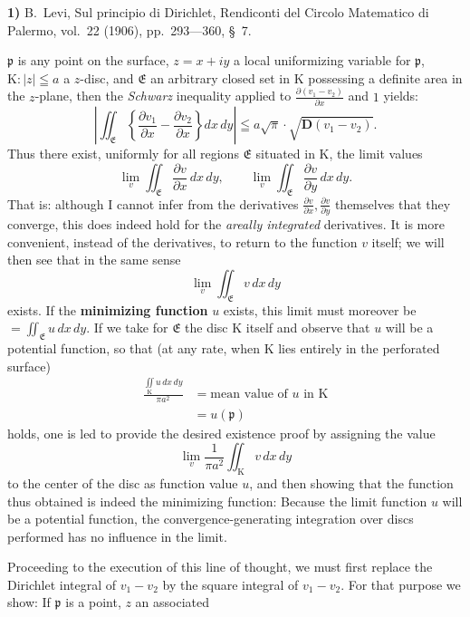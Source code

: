 \documentclass{article}
\begin{document}
\textbf{1)} B.~Levi, Sul principio di Dirichlet, Rendiconti del Circolo Matematico di Palermo, vol.~22 (1906), pp.~293---360, §~7.

$\mathfrak{p}$ is any point on the surface, $z = x + iy$ a local uniformizing variable for $\mathfrak{p}$, $\mathrm{K} : |z| \leqq a$ a $z$-disc, and $\mathfrak{E}$ an arbitrary closed set in $\mathrm{K}$ possessing a definite area in the $z$-plane, then the \emph{Schwarz} inequality applied to $\frac{\partial(v_1 - v_2)}{\partial x}$ and $1$ yields:
\[ \left| \iint_{\mathfrak{E}} \left\{ \frac{\partial v_1}{\partial x} - \frac{\partial v_2}{\partial x} \right\} dx\,dy \right| \leqq a\sqrt{\pi} \cdot \sqrt{\mathbf{D}(v_1 - v_2)}. \]
Thus there exist, uniformly for all regions $\mathfrak{E}$ situated in $\mathrm{K}$, the limit values
\[ \lim_v \iint_{\mathfrak{E}} \frac{\partial v}{\partial x}\,dx\,dy, \qquad \lim_v \iint_{\mathfrak{E}} \frac{\partial v}{\partial y}\,dx\,dy. \]
That is: although I cannot infer from the derivatives $\frac{\partial v}{\partial x}, \frac{\partial v}{\partial y}$ themselves that they converge, this does indeed hold for the \emph{areally integrated} derivatives. It is more convenient, instead of the derivatives, to return to the function $v$ itself; we will then see that in the same sense
\[ \lim_v \iint_{\mathfrak{E}} v\,dx\,dy \]
exists. If the \textbf{minimizing function} $u$ exists, this limit must moreover be $=\iint_{\mathfrak{E}} u\,dx\,dy$. If we take for $\mathfrak{E}$ the disc $\mathrm{K}$ itself and observe that $u$ will be a potential function, so that (at any rate, when $\mathrm{K}$ lies entirely in the perforated surface)
\[ \begin{aligned}
\frac{\iint\limits_{\mathrm{K}} u\,dx\,dy}{\pi a^2} &= \text{mean value of } u \text{ in } \mathrm{K} \\
&= u(\mathfrak{p})
\end{aligned} \]
holds, one is led to provide the desired existence proof by assigning the value
\[ \lim_v \frac{1}{\pi a^2} \iint_{\mathrm{K}} v\,dx\,dy \]
to the center of the disc as function value $u$, and then showing that the function thus obtained is indeed the minimizing function: Because the limit function $u$ will be a potential function, the convergence-generating integration over discs performed has no influence in the limit.

Proceeding to the execution of this line of thought, we must first replace the Dirichlet integral of $v_1 - v_2$ by the square integral of $v_1 - v_2$. For that purpose we show: If $\mathfrak{p}$ is a point, $z$ an associated
\end{document}
